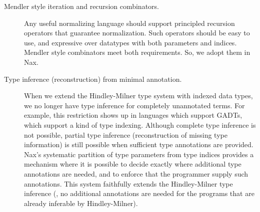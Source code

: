 \begin{description}
\item[Mendler style iteration and recursion combinators.] Any useful normalizing
language should support principled recursion operators that guarantee
normalization. Such operators should be easy to use, and expressive over datatypes
with both parameters and indices. Mendler style combinators meet both requirements.
So, we adopt them in Nax.

\item[Type inference (reconstruction) from minimal annotation.]
When we extend the Hindley-Milner type system with indexed data types,
we no longer have type inference for completely unannotated terms.
For example, this restriction shows up in languages which support GADTs,
which support a kind of type indexing.
Although complete
type inference is not possible, partial type inference (reconstruction of missing
type information) is
still possible when sufficient type annotations are provided. Nax's
systematic partition of type parameters from type indices provides
a mechanism where it is possible to decide exactly where
additional type annotations are needed, and to enforce that the
programmer supply such annotations. This system faithfully extends the Hindley-Milner
type inference (\ie, no additional annotations are needed for the programs that are
already inferable by Hindley-Milner).
\end{description}


